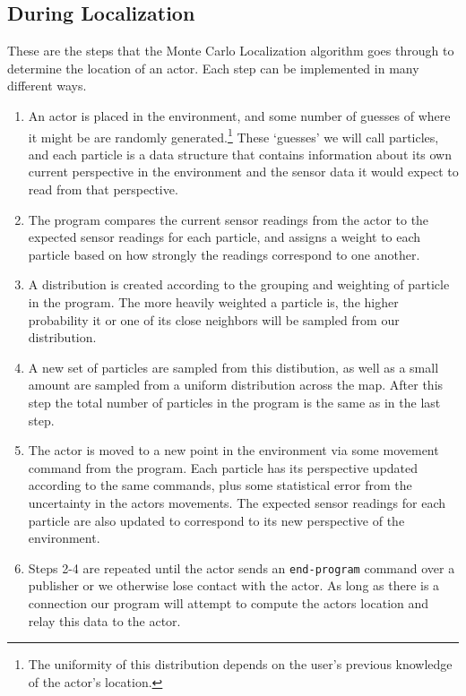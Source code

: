 \documentclass[a4paper,11pt]{article}
\begin{document}
\subsection{During Localization}
  These are the steps that the Monte Carlo Localization algorithm goes through to determine the location of an actor. Each step can be implemented in many different ways.
  \begin{enumerate}
  \item An actor is placed in the environment, and some number of guesses of where it might be are randomly generated.\footnote{The uniformity of this distribution depends on the user's previous knowledge of the actor's location.} These `guesses' we will call particles, and each particle is a data structure that contains information about its own current perspective in the environment and the sensor data it would expect to read from that perspective.
  \item The program compares the current sensor readings from the actor to the expected sensor readings for each particle, and assigns a weight to each particle based on how strongly the readings correspond to one another.
  \item A distribution is created according to the grouping and weighting of particle in the program. The more heavily weighted a particle is, the higher probability it or one of its close neighbors will be sampled from our distribution.
  \item A new set of particles are sampled from this distibution, as well as a small amount are sampled from a uniform distribution across the map. After this step the total number of particles in the program is the same as in the last step.
  \item The actor is moved to a new point in the environment via some movement command from the program. Each particle has its perspective updated according to the same commands, plus some statistical error from the uncertainty in the actors movements. The expected sensor readings for each particle are also updated to correspond to its new perspective of the environment.
  \item Steps 2-4 are repeated until the actor sends an \texttt{end-program} command over a publisher or we otherwise lose contact with the actor. As long as there is a connection our program will attempt to compute the actors location and relay this data to the actor.
  \end{enumerate} 
  
\end{document}
